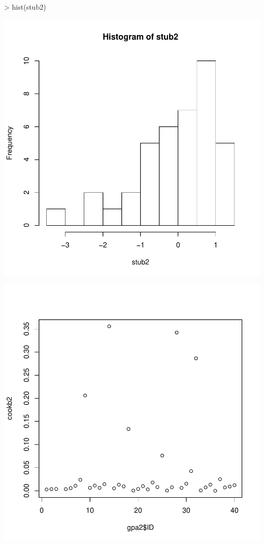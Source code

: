 \documentclass{article}
\begin{document}
\begin{Schunk}
\begin{Sinput}
> hist(stub2)
\end{Sinput}
\end{Schunk}
\includegraphics{Assignment4a-015}

\begin{Schunk}
\end{Schunk}
\includegraphics{Assignment4a-016}
\end{document}
